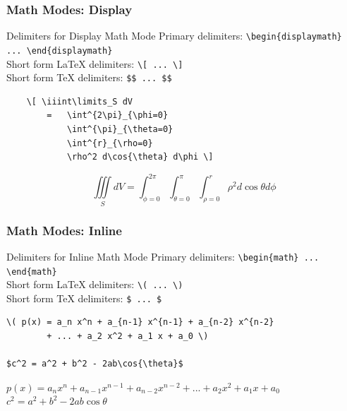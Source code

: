 \begin{frame}[fragile]
\frametitle{Math Modes: Display} 
\begin{block}{Delimiters for Display Math Mode}
\small
Primary delimiters: \verb|\begin{displaymath} ... \end{displaymath}| \\
Short form \LaTeX{} delimiters: \verb|\[ ... \]| \\
Short form TeX delimiters: \verb|$$ ... $$| \\
\end{block}
\begin{exampleblock}{}
\small
\begin{verbatim}
    \[ \iiint\limits_S dV 
        =   \int^{2\pi}_{\phi=0}
            \int^{\pi}_{\theta=0}  
            \int^{r}_{\rho=0} 
            \rho^2 d\cos{\theta} d\phi \]
\end{verbatim}
    \[ \iiint\limits_S dV = \int^{2\pi}_{\phi=0} \int^{\pi}_{\theta=0} \int^{r}_{\rho=0} \rho^2 d\cos{\theta} d\phi \]
\end{exampleblock}
\end{frame}


\begin{frame}[fragile]
\frametitle{Math Modes: Inline} 
\begin{block}{Delimiters for Inline Math Mode}
\small
Primary delimiters: \verb|\begin{math} ... \end{math}| \\
Short form \LaTeX{} delimiters: \verb|\( ... \)| \\
Short form TeX delimiters: \verb|$ ... $| \\
\end{block}
\vspace{0.3cm}
\small
\begin{verbatim}
\( p(x) = a_n x^n + a_{n-1} x^{n-1} + a_{n-2} x^{n-2} 
        + ... + a_2 x^2 + a_1 x + a_0 \)

$c^2 = a^2 + b^2 - 2ab\cos{\theta}$
\end{verbatim}
\vspace{0.3cm}
\( p(x) = a_n x^n + a_{n-1} x^{n-1} + a_{n-2} x^{n-2} 
        + ... + a_2 x^2 + a_1 x + a_0 \) \\[\baselineskip]
\vspace{0.3cm}
$c^2 = a^2 + b^2 - 2ab\cos{\theta}$
\end{frame}


